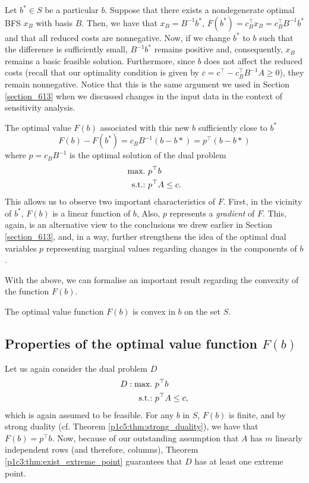 Let $b^* \in S$ be a particular $b$. Suppose that there exists a nondegenerate optimal BFS $x_B$ with basis $B$. Then, we have that $x_B = B^{-1}b^*$, $F(b^*) = c_B^\top x_B =  c_B^\top B^{-1}b^*$ and that all reduced costs are nonnegative. Now, if we change $b^*$ to $b$ such that the difference is sufficiently small, $B^{-1}b^*$ remains positive and, consequently, $x_B$ remains a basic feasible solution. Furthermore, since $b$ does not affect the reduced costs (recall that our optimality condition is given by $\overline{c} = c^\top - c_B ^\top B^{-1}A \ge 0$), they remain nonnegative. Notice that this is the same argument we used in Section \ref{section_613} when we discussed changes in the input data in the context of sensitivity analysis.

The optimal value $F(b)$ associated with this new $b$ sufficiently close to $b^*$   
%
\begin{equation*}
	F(b) - F(b^*)= c_B B^{-1}(b - b*) = p^\top (b - b*) 
\end{equation*}
%
where $p = c_B B^{-1}$ is the optimal solution of the dual problem 
%
\begin{align*}
	\mathop{\text{max.~}} & p^\top b \\
	\mathop{\text{s.t.:~}}   & p^\top A \le c.
\end{align*}
%
This allows us to observe two important characteristics of $F$. First, in the vicinity of $b^*$, $F(b)$ is a linear function of $b$, Also, $p$ represents a \emph{gradient} of $F$. This, again, is an alternative view to the conclusions we drew earlier in Section \ref{section_613}, and, in a way, further strengthens the idea of the optimal dual variables $p$ representing marginal values regarding changes in the components of $b$.

With the above, we can formalise an important result regarding the convexity of the function $F(b)$.

\begin{theorem}[Convexity of $F(b)$]
	The optimal value function $F(b)$ is convex in $b$ on the set $S$.
\end{theorem}



\subsection{Properties of the optimal value function $F(b)$} \label{section_732}

Let us again consider the dual problem $D$
%
\begin{align*}
	D: \mathop{\text{max.~}} & p^\top b \\
	\mathop{\text{s.t.:~}}   & p^\top A \le c,
\end{align*}
%
which is again assumed to be feasible. For any $b$ in $S$, $F(b)$ is finite, and by strong duality (cf. Theorem \ref{p1c5:thm:strong_duality}), we have that $F(b) = p^\top b$. Now, because of our outstanding assumption that $A$ has $m$ linearly independent rows (and therefore, columns), Theorem \ref{p1c3:thm:exist_extreme_point} guarantees that $D$ has at least one extreme point.

